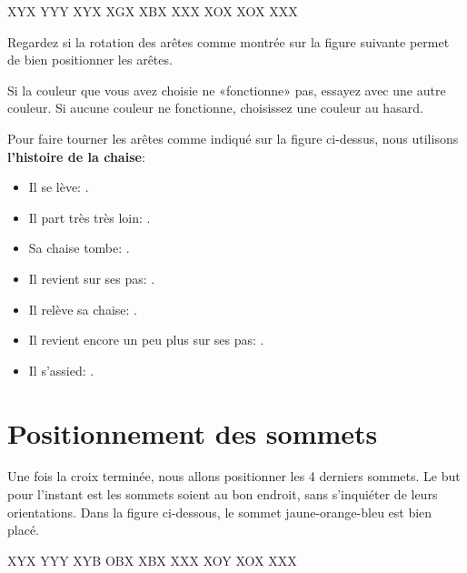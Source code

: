 \begin{center}	
	\RubikFaceUp%
	{X}{Y}{X}%
	{Y}{Y}{Y}%
	{X}{Y}{X}
	\RubikFaceRight%
	{X}{G}{X}%
	{X}{B}{X}%
	{X}{X}{X}
	\RubikFaceFront%
	{X}{O}{X}%
	{X}{O}{X}%
	{X}{X}{X}
\end{center}

Regardez si la rotation des arêtes comme montrée sur la figure suivante permet de bien positionner les arêtes. 
 

\begin{center}	
\end{center}

Si la couleur que vous avez choisie ne «fonctionne» pas, essayez avec une autre couleur. Si aucune couleur ne fonctionne, choisissez une couleur au hasard.

Pour faire tourner les arêtes comme indiqué sur la figure ci-dessus, nous utilisons \textbf{l'histoire de la chaise}:

\begin{itemize}
	\item Il se lève: .
	\item Il part très très loin: .
	\item Sa chaise tombe: .
	\item Il revient sur ses pas: .
	\item Il relève sa chaise: .
	\item Il revient encore un peu plus sur ses pas: .	
	\item Il s'assied: .
\end{itemize}

\section{Positionnement des sommets}

Une fois la croix terminée, nous allons positionner les 4 derniers sommets. Le but pour l'instant est les sommets soient au bon endroit, sans s'inquiéter de leurs orientations. Dans la figure ci-dessous, le sommet jaune-orange-bleu est bien placé.

\begin{center}	
	\RubikFaceUp%
	{X}{Y}{X}%
	{Y}{Y}{Y}%
	{X}{Y}{B}
	\RubikFaceRight%
	{O}{B}{X}%
	{X}{B}{X}%
	{X}{X}{X}
	\RubikFaceFront%
	{X}{O}{Y}%
	{X}{O}{X}%
	{X}{X}{X}
\end{center}

